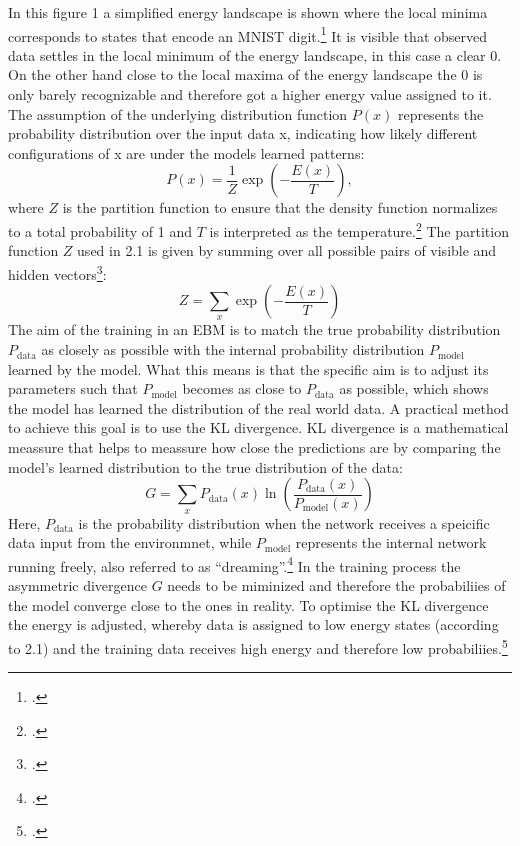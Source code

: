 In this figure 1 a simplified energy landscape is shown where the local minima corresponds to states that encode an MNIST digit.\footcite[cf.][6]{huembeliPhysicsEnergybasedModels2022} It is visible that observed data settles in the local minimum of the energy landscape, in this case a clear 0. On the other hand close to the local maxima of the energy landscape the 0 is only barely recognizable and therefore got a higher energy value assigned to it.
The assumption of the underlying distribution function \( P(x) \) represents the probability distribution over the input data x,
indicating how likely different configurations of x are under the models learned patterns:
\begin{equation}
    P(x) = \frac{1}{Z} \exp\left(-\frac{E(x)}{T}\right),
\end{equation}
where \( Z \) is the partition function to ensure
that the density function normalizes to a total probability of 1 and \( T \) is interpreted as the temperature.\footcite[cf.][2-3]{huembeliPhysicsEnergybasedModels2022}
The partition function \( Z \) used in 2.1 is given by summing over all possible pairs of visible and hidden vectors\footcite[cf.][4]{hintonPracticalGuideTraining2012}:
\begin{equation}
    Z = \sum_x \exp\left(-\frac{E(x)}{T}\right)
\end{equation}
The aim of the training in an \ac{EBM} is to match the true probability distribution \( P_{\text{data}} \) as closely as possible with the internal probability distribution \( P_{\text{model}} \) learned by the model.
What this means is that the specific aim is to adjust its parameters such that \( P_{\text{model}} \)
becomes as close to \( P_{\text{data}} \) as possible, which shows the model has learned the distribution of the real world data.
A practical method to achieve this goal is to use the KL divergence. KL divergence is a mathematical meassure that helps to meassure how close the predictions are by comparing the model's learned distribution to the true distribution of the data:
\begin{equation}
    G = \sum_x P_{\text{data}}(x) \ln \left( \frac{P_{\text{data}}(x)}{P_{\text{model}}(x)} \right)
\end{equation}
Here, \( P_{\text{data}} \) is the probability distribution when the network receives a speicific data input from the environmnet, while \( P_{\text{model}} \) represents the internal network running freely, also referred to as ``dreaming''.\footcite[cf.][154-155]{ackleyLearningAlgorithmBoltzmann1985}
In the training process the asymmetric divergence \( G \) needs to be miminized and therefore the probabiliies of the model converge close to the ones in reality.
To optimise the KL divergence the energy is adjusted, whereby data is assigned to low energy states (according to 2.1) and the training data receives high energy and therefore low probabiliies.\footcite[cf.][2-3]{zhaiDeepStructuredEnergy2016}

